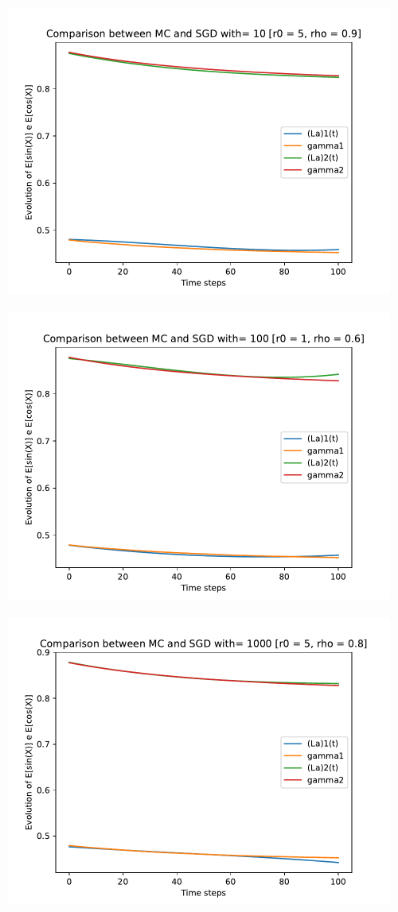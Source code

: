 \documentclass[a4paper,11pt,openright]{report}
\begin{document}
\begin{figure}[H]
\centering
\includegraphics[width=0.9\textwidth]{images/graphs T = 1/n = 3, M = 10 sine and cosine.pdf}
\end{figure}
\begin{figure}[H]
\centering
\includegraphics[width=0.9\textwidth]{images/graphs T = 1/n = 3, M = 100 sine and cosine.pdf}
\end{figure}
\begin{figure}[H]
\centering
\includegraphics[width=0.9\textwidth]{images/graphs T = 1/n = 3, M = 1000 sine and cosine.pdf}
\end{figure}
\end{document}
